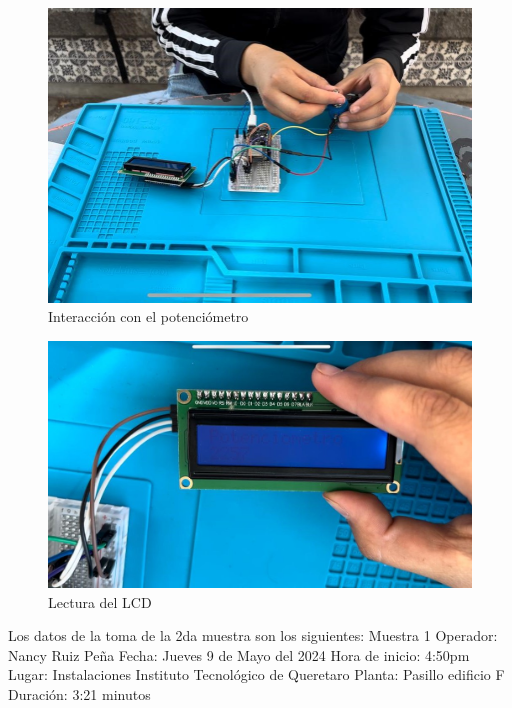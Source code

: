     \begin{figure}[H]
        \centering
        \includegraphics[scale=0.34]{35/Img/evidenciaM12.jpeg}
        \caption{Interacción con el potenciómetro}
    \end{figure}
    
    
    \begin{figure}[H]
        \centering
        \includegraphics[scale=0.28]{35/Img/evidenciaM13.jpeg}
        \caption{Lectura del LCD}
    \end{figure}
    
    Los datos de la toma de la 2da muestra son los siguientes:
    \newline
    Muestra 1
    \newline
    Operador: Nancy Ruiz Peña
    \newline
    Fecha: Jueves 9 de Mayo del 2024
    \newline
    Hora de inicio: 4:50pm
    \newline
    Lugar: Instalaciones Instituto Tecnológico de Queretaro
    \newline
    Planta: Pasillo edificio F
    \newline
    Duración: 3:21 minutos
    \newline
    
